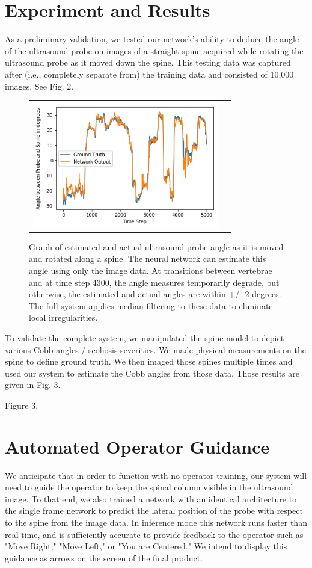 \documentclass{article}
\begin{document}
\section{Experiment and Results}

As a preliminary validation, we tested our network’s ability to deduce the angle of the ultrasound probe on images of a straight spine acquired while rotating the ultrasound probe as it moved down the spine.  This testing data was captured after (i.e., completely separate from) the training data and consisted of 10,000 images.  See Fig. 2.

\begin{figure}
\centering
\begin{tabular}{cc}
\centering
\includegraphics[height=5.5cm,keepaspectratio]{NetworkOutput}
\end{tabular}
\caption{Graph of estimated and actual ultrasound probe angle as it is moved and rotated along a spine.  The neural network can estimate this angle using only the image data.  At transitions between vertebrae and at time step 4300, the angle measures temporarily degrade, but otherwise, the estimated and actual angles are within +/- 2 degrees.  The full system applies median filtering to these data to eliminate local irregularities.
}
\end{figure}
 

To validate the complete system, we manipulated the spine model to depict various Cobb angles / scoliosis severities.   We made physical measurements on the spine to define ground truth.  We then imaged those spines multiple times and used our system to estimate the Cobb angles from those data.  Those results are given in Fig. 3.


Figure 3. 

\section{Automated Operator Guidance}
We anticipate that in order to function with no operator training, our system will need to guide the operator to keep the spinal column visible in the ultrasound image. To that end, we also trained a network with an identical architecture to the single frame network to predict the lateral position of the probe with respect to the spine from the image data. In inference mode this network runs faster than real time, and is sufficiently accurate to provide feedback to the operator such as "Move Right," "Move Left," or "You are Centered." We intend to display this guidance as arrows on the screen of the final product.
\end{document}
